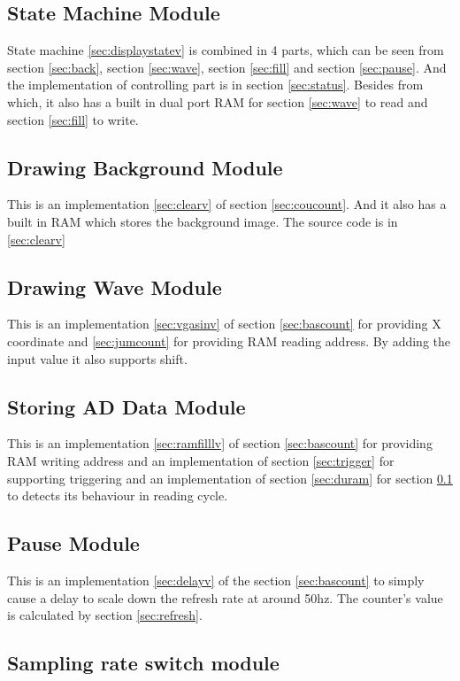 \documentclass[11pt]{scrartcl}
\begin{document}
\subsection{State Machine Module}
\label{sec:statusm}
State machine \ref{sec:displaystatev} is combined in 4 parts, which can be seen from section \ref{sec:back}, section \ref{sec:wave}, section \ref{sec:fill} and section \ref{sec:pause}. And the implementation of controlling part is in section \ref{sec:status}. Besides from which, it also has a built in dual port RAM for section \ref{sec:wave} to read and section \ref{sec:fill} to write.
\subsection{Drawing Background Module}
This is an implementation \ref{sec:clearv} of section \ref{sec:coucount}. And it also has a built in RAM which stores the background image. The source code is in \ref{sec:clearv}
\label{sec:back}

\subsection{Drawing Wave Module}
This is an implementation \ref{sec:vgasinv} of section \ref{sec:bascount} for providing X coordinate and \ref{sec:jumcount} for providing RAM reading address. By adding the input value it also supports shift.
\label{sec:wave}

\subsection{Storing AD Data Module}
This is an implementation \ref{sec:ramfilllv} of section \ref{sec:bascount} for providing RAM writing address and an implementation of section \ref{sec:trigger} for supporting triggering and an implementation of section \ref{sec:duram} for section \ref{sec:statusm} to detects its behaviour in reading cycle.
\label{sec:fill}

\subsection{Pause Module}
This is an implementation \ref{sec:delayv} of the section \ref{sec:bascount} to simply cause a delay to scale down the refresh rate at around 50hz. The counter's value is calculated by section \ref{sec:refresh}.
\label{sec:pause}

\subsection{Sampling rate switch module}
\end{document}

